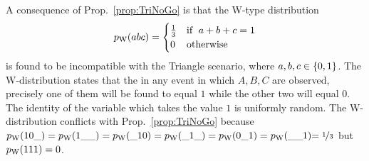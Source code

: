 \begin{EDITING...}
\begin{comment}
\\\nonumber &\leq\!\iiint%
\!\!\begin{pmatrix}\p{b'|\lambda_{AB},\lambda_{BC}} \p{c'|\lambda_{BC},\lambda_{AC}}\times\\ \p{a'|\lambda_{AC},\lambda_{AB}}\p{\lambda_{AB}}\p{\lambda_{BC}} \p{\lambda_{AC}}\end{pmatrix}
\\\nonumber&=\p{a' b' c'}
\end{align}
analogous to \cref{eq:hardyintegrals}.\end{proof}
\end{comment}

A consequence of Prop.~\ref{prop:TriNoGo} is that the W-type distribution
\begin{align}\label{eq:wdistribution}
p_{\text{W}}\lparen abc\rparen=\begin{cases}\tfrac{1}{3}&\text{if }\; a+b+c=1 \\ 0&\text{otherwise}\end{cases}
\end{align}
is found to be incompatible with the Triangle scenario, where $a,b,c\in\left\lbrace0,1\right\rbrace$. The W-distribution states that the in any event in which $A,B,C$ are observed, precisely one of them will be found to equal $1$ while the other two will equal $0$. The identity of the variable which takes the value $1$ is uniformly random. The W-distribution conflicts with Prop.~\ref{prop:TriNoGo} because ${p_{\text{W}}\lparen10\_\rparen}={p_{\text{W}}\lparen1\_\_\rparen}={p_{\text{W}}\lparen\_10\rparen}={p_{\text{W}}\lparen\_1\_\rparen}={p_{\text{W}}\lparen0\_1\rparen}={p_{\text{W}}\lparen\_\_1\rparen}{=\nicefrac{1}{3}}$ but ${p_{\text{W}}\lparen111\rparen}=0$.%



\end{EDITING...}
